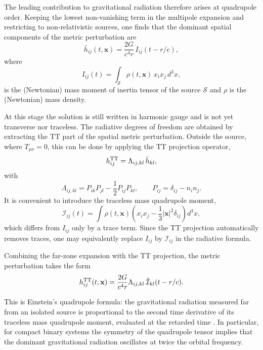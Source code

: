 The leading contribution to gravitational radiation therefore arises at quadrupole order. Keeping the lowest non-vanishing term in the multipole expansion and restricting to non-relativistic sources, one finds that the dominant spatial components of the metric perturbation are
\begin{equation}
\bar h_{ij}(t,\mathbf{x}) = \frac{2G}{c^4 r} \,
\ddot I_{ij}(t - r/c),
\end{equation}
where
\begin{equation}
I_{ij}(t) = \int_{\mathcal{S}} \rho(t,\mathbf{x})\, x_i x_j \, d^3x,
\end{equation}
is the (Newtonian) mass moment of inertia tensor of the source $\mathcal{S}$ and $\rho$ is the (Newtonian) mass density.

At this stage the solution is still written in harmonic gauge and is not yet transverse nor traceless. 
The radiative degrees of freedom are obtained by extracting the TT part of the spatial metric perturbation. 
Outside the source, where $T_{\mu\nu}=0$, this can be done by applying the TT projection operator,
\begin{equation}
h_{ij}^{\rm TT} = \Lambda_{ij,kl}\,\bar h_{kl},
\end{equation}
with
\begin{equation}
\Lambda_{ij,kl} = P_{ik}P_{jl} - \frac{1}{2}P_{ij}P_{kl},
\qquad
P_{ij} = \delta_{ij} - n_i n_j.
\end{equation}
It is convenient to introduce the traceless mass quadrupole moment,
\begin{equation}
\mathcal{I}_{ij}(t)
=
\int \rho(t,\mathbf{x})
\left(
x_i x_j - \frac{1}{3} |\mathbf{x}|^2 \delta_{ij}
\right)
d^3x,
\end{equation}
which differs from $I_{ij}$ only by a trace term. 
Since the TT projection automatically removes traces, one may equivalently replace $I_{ij}$ by $\mathcal{I}_{ij}$ in the radiative formula.

Combining the far-zone expansion with the TT projection, the metric perturbation takes the form
\begin{equation}
h_{ij}^{\rm TT}(t,\mathbf{x})
=
\frac{2G}{c^4 r}
\Lambda_{ij,kl}\,
\ddot{\mathcal{I}}_{kl}(t - r/c).
\end{equation}  

This is Einstein’s quadrupole formula: 
the gravitational radiation measured far from an isolated source 
is proportional to the second time derivative of its traceless mass quadrupole moment, 
evaluated at the retarded time \cite{Theory_of_Gravitational_Waves_arxiv}. In particular, for compact binary systems the symmetry of the quadrupole tensor 
implies that the dominant gravitational radiation oscillates at twice the orbital frequency.

